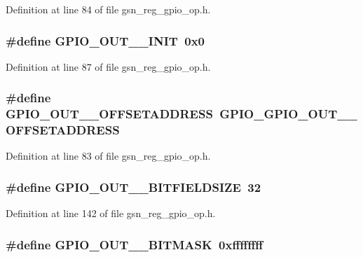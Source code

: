 Definition at line 84 of file gsn\_\-reg\_\-gpio\_\-op.h.

\hypertarget{a00553_add2b0785b1679fc5f3f05cfee3c6731f}{
\subsubsection[{GPIO\_\-OUT\_\-0\_\-INIT}]{\setlength{\rightskip}{0pt plus 5cm}\#define GPIO\_\-OUT\_\_\-INIT~0x0}}
\label{a00553_add2b0785b1679fc5f3f05cfee3c6731f}


Definition at line 87 of file gsn\_\-reg\_\-gpio\_\-op.h.

\hypertarget{a00553_ae3b65876b30e8519e5bf10fd352fe39c}{
\subsubsection[{GPIO\_\-OUT\_\-0\_\-OFFSETADDRESS}]{\setlength{\rightskip}{0pt plus 5cm}\#define GPIO\_\-OUT\_\_\-OFFSETADDRESS~GPIO\_\-GPIO\_\-OUT\_\_\-OFFSETADDRESS}}
\label{a00553_ae3b65876b30e8519e5bf10fd352fe39c}


Definition at line 83 of file gsn\_\-reg\_\-gpio\_\-op.h.

\hypertarget{a00553_adc47237e815b1afcbc277184063c7537}{
\subsubsection[{GPIO\_\-OUT\_\-1\_\-BITFIELDSIZE}]{\setlength{\rightskip}{0pt plus 5cm}\#define GPIO\_\-OUT\_\_\-BITFIELDSIZE~32}}
\label{a00553_adc47237e815b1afcbc277184063c7537}


Definition at line 142 of file gsn\_\-reg\_\-gpio\_\-op.h.

\hypertarget{a00553_aaed59b7cfbeab5dc70b74f345d1dece1}{
\subsubsection[{GPIO\_\-OUT\_\-1\_\-BITMASK}]{\setlength{\rightskip}{0pt plus 5cm}\#define GPIO\_\-OUT\_\_\-BITMASK~0xffffffff}}
\label{a00553_aaed59b7cfbeab5dc70b74f345d1dece1}


